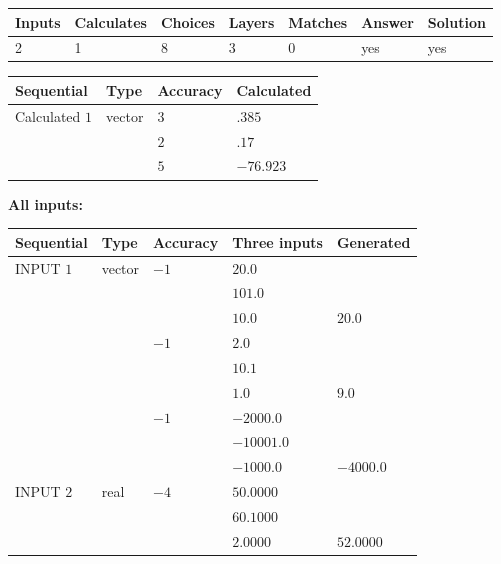 \documentclass[12pt]{article}
\begin{document}
 

 
\vspace{0.3in}
   
   
   
   
\noindent\begin{tabular}{|l|l|l|l|l|l|l|}
 \hline
Inputs & Calculates & Choices & Layers & Matches & Answer & Solution \\ \hline
           2 & 
           1 & 
           8
  & 
           3 & 
           0 & 
  yes & 
  yes 
  \\ \hline
 \end{tabular}
   
   
   
   
\noindent{}
   
   
  
  
\noindent\begin{tabular}{|l|l|l|l|}
\hline
 Sequential & Type & Accuracy & Calculated \\ 
\hline
 
 
  Calculated $           1$ & vector &  
  $           3 $ 
 &  $ .385 $ 
 \\    
  & & 
  $           2 $ 
 &  $ .17 $ 
 \\    
  & & 
  $           5 $ 
 &  $ -76.923 $ 
 \\  \hline  
 \end{tabular}
   
   
   
   
\noindent\vspace{0.1in}\hspace{-0.08in} {\textbf{\Large{All inputs: }}}
   
   
  
  
\noindent\begin{tabular}{|l|l|l|l|l|}
\hline
 Sequential & Type & Accuracy & Three inputs & Generated \\ 
\hline
 
 
  INPUT $           1$ & vector & $          -1 $ & $
20.0
  $ & \\
  & & & $
101.0
  $ & \\
  & & & $
10.0
$ & $ 20.0 $ 
  \\
  & & $          -1 $ & $
2.0
  $ & \\
  & & & $
10.1
  $ & \\
  & & & $
1.0
$ & $ 9.0 $ 
  \\
  & & $          -1 $ & $
-2000.0
  $ & \\
  & & & $
-10001.0
  $ & \\
  & & & $
-1000.0
$ & $ -4000.0 $ 
 \\  \hline  
 
 
  INPUT $           2$ & real & $          -4 $ & $
 50.0000
  $ & \\
  & & &  $
 60.1000
  $ & \\
  & & &  $
 2.0000
 $ & $ 52.0000 $ 
 \\  \hline  
 \end{tabular}
   
\end{document}
